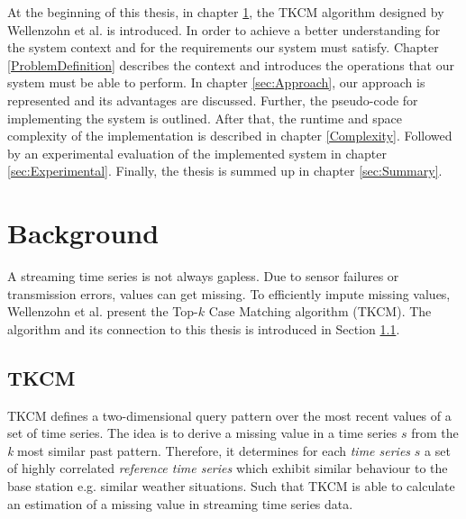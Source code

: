 \documentclass[abstracton,12pt]{scrreprt}
\begin{document}
At the beginning of this thesis, in chapter \ref{background}, the TKCM algorithm designed by Wellenzohn et al.\cite{BScT} is introduced. In order to achieve a better understanding for the system context and for the requirements our system must satisfy. Chapter \ref{ProblemDefinition} describes the context and introduces the operations that our system must be able to perform. In chapter \ref{sec:Approach}, our approach is represented and its advantages are discussed. Further, the pseudo-code for implementing the system is outlined. After that, the runtime and space complexity of the implementation is described in chapter \ref{Complexity}. Followed by an experimental evaluation of the implemented system in chapter \ref{sec:Experimental}. Finally, the thesis is summed up in chapter \ref{sec:Summary}.


\newtheorem{defn}{Definition}[section]
\newtheorem{exmp}{Example}[section]
\newcommand*{\argmin}{\operatornamewithlimits{argmin}\limits}

\chapter{Background}
\label{background}
A streaming time series is not always gapless. Due to sensor failures or transmission errors, values can get missing. To efficiently impute missing values, Wellenzohn et al.\cite{BScT} present the Top-$k$ Case Matching algorithm (TKCM). The algorithm and its connection to this thesis is introduced in Section \ref{TKCM}.

\section{TKCM}
\label{TKCM}
TKCM defines a two-dimensional query pattern over the most recent values of a set of time series. 
The idea is to derive a missing value in a time series $s$ from the \emph{k} most similar past pattern. Therefore, it determines for each \emph{time series} $s$ a set of highly correlated \emph{reference time series} which exhibit similar behaviour to the base station e.g. similar weather situations. Such that TKCM is able to calculate an estimation of a missing value in streaming time series data. 
\end{document}
